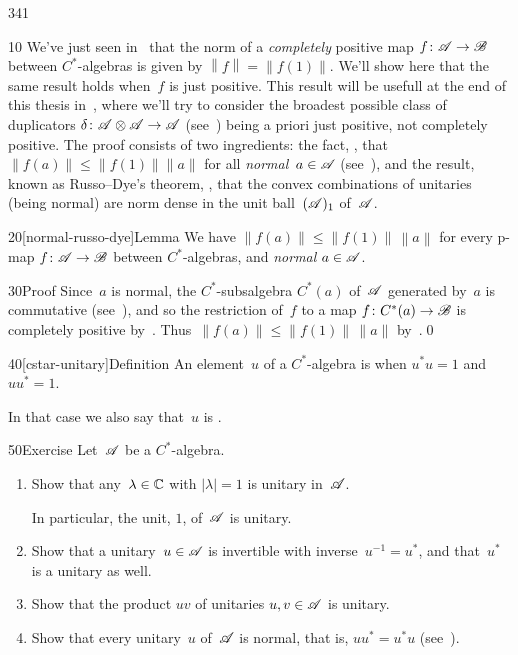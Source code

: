 \begin{parsec}{341}%
\begin{point}{10}%
We've just seen in~
that the norm of a \emph{completely} positive map 
    $f\colon \mathscr{A}\to\mathscr{B}$ between $C^*$-algebras
is given by $\left\|f\right\|=\left\|f(1)\right\|$.
We'll show here that the same result holds
when~$f$ is just positive.
This result will be usefull at the end of this
thesis in~, where we'll
try to consider the broadest possible class
of duplicators
$\delta\colon \mathscr{A} \otimes \mathscr{A}\to\mathscr{A}$
    (see~)
being a priori just positive,
not completely positive.
The proof consists of two ingredients:
    the fact, ,
    that $\left\|f(a)\right\|\leq \|f(1)\| \|a\|$
    for all \emph{normal}~$a\in\mathscr{A}$ (see~),
and the result,
known as Russo--Dye's theorem,
,
that the convex combinations
of unitaries (being normal)
are norm dense in the unit ball~$(\mathscr{A})_1$
of~$\mathscr{A}$.
\end{point}
\begin{point}{20}[normal-russo-dye]{Lemma}%
We have $\left\|f(a)\right\| \leq \left\|f(1)\right\|\,\left\|a\right\|$
for every p-map $f\colon \mathscr{A}\to\mathscr{B}$ between $C^*$-algebras,
and \emph{normal} $a\in\mathscr{A}$.
    \begin{point}{30}{Proof}%
Since~$a$ is normal,
the $C^*$-subsalgebra $C^*(a)$
of~$\mathscr{A}$ generated by~$a$
is commutative (see~),
and so the restriction of~$f$
to a map $f\colon C^*(a)\to\mathscr{B}$
is completely positive by~.
Thus~$\|f(a)\|\leq \|f(1)\|\,\|a\|$ by~.\qed
\end{point}
\end{point}
\begin{point}{40}[cstar-unitary]{Definition}%
An element~$u$ of a $C^*$-algebra
is 
when $u^*u=1$ and~$uu^*=1$.

    In that case we also say that~$u$ is .
\end{point}
\begin{point}{50}{Exercise}%
Let~$\mathscr{A}$ be a $C^*$-algebra.
\begin{enumerate}
\item
Show that any~$\lambda\in\mathbb{C}$ with $\left|\lambda\right|=1$
is unitary in~$\mathscr{A}$.

In particular, the unit, $1$, of~$\mathscr{A}$ is unitary.
\item
Show that a unitary~$u\in \mathscr{A}$ is invertible with inverse~$u^{-1}=u^*$,
and that~$u^*$ is a unitary as well.
\item
Show that the product $uv$ of unitaries $u,v\in\mathscr{A}$
is unitary.
\item
Show that every unitary~$u$ of~$\mathscr{A}$ is normal,
that is, $uu^*=u^*u$
(see~).


\end{enumerate}
\end{point}
\end{parsec}
